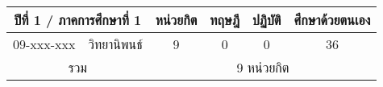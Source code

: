 \begin{tabular}{|cl|cccc|}
\hline
\multicolumn{2}{|c|}{ปีที่ 1 / ภาคการศึกษาที่ 1} & \multicolumn{1}{c|}{หน่วยกิต} & \multicolumn{1}{c|}{ทฤษฎี} & \multicolumn{1}{c|}{ปฏิบัติ} & ศึกษาด้วยตนเอง \\ \hline
\multicolumn{1}{|c|}{09-xxx-xxx}  & วิทยานิพนธ์  & \multicolumn{1}{c|}{9}        & \multicolumn{1}{c|}{0}     & \multicolumn{1}{c|}{0}       & 36             \\ \hline
\multicolumn{2}{|c|}{รวม}                        & \multicolumn{4}{c|}{9 หน่วยกิต}                                                                            \\ \hline
\end{tabular}